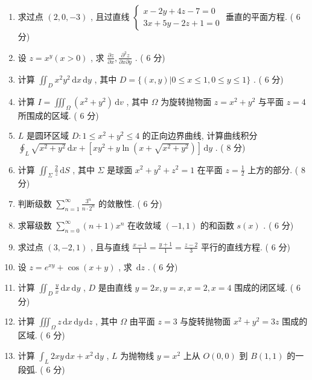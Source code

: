 \documentclass[cn,11pt,fancy,hide]{elegantbook}
\newcommand{\dd}{\,\mathrm{d}}
\renewcommand{\leq}{\leqslant}
\begin{document}
\begin{enumerate}
	\item 求过点 $(2,0,-3)$ , 且过直线 $\begin{cases}
	x-2 y+4 z-7=0\\
	3 x+5 y-2 z+1=0
	\end{cases}$ 垂直的平面方程. ( $6$ 分)
	
	\item 设 $z=x^{y}(x>0)$ , 求 $\frac{\partial z}{\partial x}, \frac{\partial^{2} z}{\partial x \partial y}$ . ( $6$ 分)
	
	\item 计算 $\iint_{D} x^{2} y^{2} \dd x \dd y$ , 其中 $D=\{(x, y) | 0 \leq x \leq 1,0 \leq y \leq 1\}$ . ( $6$ 分)
	
	\item 计算 $I=\iiint_{\Omega}\left(x^{2}+y^{2}\right) \dd v$ , 其中 $\Omega$ 为旋转抛物面 $z=x^{2}+y^{2}$ 与平面 $z=4$ 所围成的区域. ( $6$ 分)
	
	\item $L$ 是圆环区域 $D : 1 \leq x^{2}+y^{2} \leq 4$ 的正向边界曲线, 计算曲线积分 $\oint_{L} \sqrt{x^{2}+y^{2}} \dd x+\left[x y^{2}+y \ln \left(x+\sqrt{x^{2}+y^{2}}\right)\right] \dd y$ . ( $8$ 分)
	
	\item 计算 $\iint_{\Sigma} \frac{2}{z} \dd S$ , 其中 $\Sigma$ 是球面 $x^{2}+y^{2}+z^{2}=1$ 在平面 $z=\frac{1}{2}$ 上方的部分. ( $8$ 分)
	
	\item 判断级数 $\sum_{n=1}^{\infty} \frac{3^{n}}{n \cdot 2^{n}}$ 的敛散性. ( $6$ 分)
	
	\item 求幂级数 $\sum_{n=0}^{\infty}(n+1) x^{n}$ 在收敛域 $(-1,1)$ 的和函数 $s(x)$ . ( $6$ 分)
	
	\item 求过点 $(3,-2,1)$ ,  且与直线 $\frac{x-1}{1}=\frac{y+1}{1}=\frac{z-2}{3}$ 平行的直线方程. ( $6$ 分)
	
	\item 设 $ z = e^{xy} + \cos(x + y)$ , 求 $\dd z$ . ( $6$ 分)
	
	\item 计算 $\iint_{D}\frac{y}{x}\dd x\dd y$ , $D$ 是由直线 $ y = 2x,y = x, x = 2, x = 4$ 围成的闭区域. ( $6$ 分)
	
	\item 计算 $\iiint_{\Omega}z\dd x\dd y\dd z$ , 其中 $\Omega$ 由平面 $z = 3$ 与旋转抛物面 $x^2 + y^2 = 3z$ 围成的区域. ( $6$ 分)
	
	\item 计算 $\int_{L} 2 x y \dd x+x^{2} \dd y$ , $L$  为抛物线 $y=x^{2}$ 上从 $O(0,0)$ 到 $B(1,1)$ 的一段弧. ( $6$ 分)
	

\end{enumerate}
\end{document}
